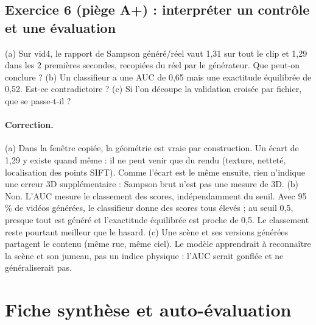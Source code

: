 \documentclass[11pt,a4paper]{article}
\begin{document}
\subsection*{Exercice 6 (piège A+) : interpréter un contrôle et une évaluation}
(a) Sur vid4, le rapport de Sampson généré/réel vaut 1,31 sur tout le clip et 1,29 dans les 2 premières
secondes, recopiées du réel par le générateur. Que peut-on conclure ? (b) Un classifieur a une AUC de
0,65 mais une exactitude équilibrée de 0,52. Est-ce contradictoire ? (c) Si l'on découpe la validation
croisée par fichier, que se passe-t-il ?

\paragraph{Correction.}
(a) Dans la fenêtre copiée, la géométrie est vraie par construction. Un écart de 1,29 y existe quand
même : il ne peut venir que du rendu (texture, netteté, localisation des points SIFT). Comme l'écart est
le même ensuite, rien n'indique une erreur 3D supplémentaire : Sampson brut n'est pas une mesure de 3D.
(b) Non. L'AUC mesure le classement des scores, indépendamment du seuil. Avec 95\,\% de vidéos générées,
le classifieur donne des scores tous élevés ; au seuil 0,5, presque tout est \og généré \fg{} et
l'exactitude équilibrée est proche de 0,5. Le classement reste pourtant meilleur que le hasard.
(c) Une scène et ses versions générées partagent le contenu (même rue, même ciel). Le modèle
apprendrait à reconnaître la scène et son jumeau, pas un indice physique : l'AUC serait gonflée et
ne généraliserait pas.

\section{Fiche synthèse et auto-évaluation}
\end{document}
